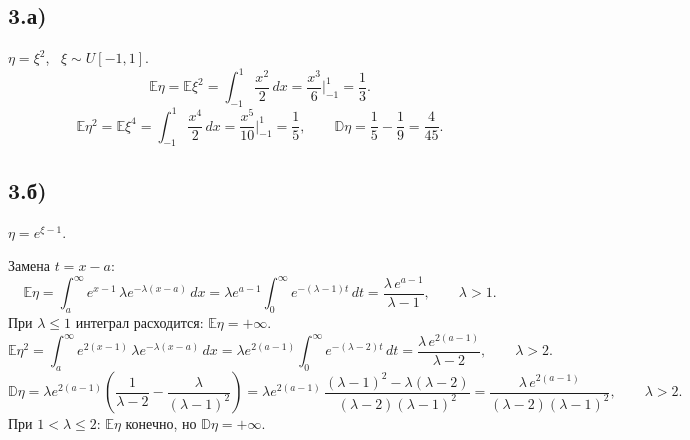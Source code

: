 \documentclass[11pt,a4paper]{article}
\newcommand{\E}{\mathbb{E}}
\newcommand{\D}{\mathbb{D}}
\begin{document}
\subsection*{3.а)} $\eta = \xi^2$, \ $\xi\sim U[-1,1]$.
\[
  \E\eta = \E\xi^2 = \int_{-1}^{1}\frac{x^2}{2}\,dx = \frac{x^3}{6}\Big|_{-1}^{1} = \boxed{\frac13}.
\]
\[
  \E\eta^2 = \E\xi^4 = \int_{-1}^{1}\frac{x^4}{2}\,dx = \frac{x^5}{10}\Big|_{-1}^{1} = \frac15,
  \qquad
  \D\eta = \frac15 - \frac19 = \boxed{\frac{4}{45}}.
\]

\subsection*{3.б)} $\eta = e^{\xi-1}$.

Замена $t = x - a$:
\[
  \E\eta = \int_a^\infty e^{x-1}\,\lambda e^{-\lambda(x-a)}\,dx
         = \lambda e^{a-1}\int_0^\infty e^{-(\lambda-1)t}\,dt
         = \boxed{\frac{\lambda\,e^{a-1}}{\lambda-1}}, \qquad \lambda>1 .
\]
При $\lambda\le 1$ интеграл расходится: $\E\eta = +\infty$.
\[
  \E\eta^2 = \int_a^\infty e^{2(x-1)}\,\lambda e^{-\lambda(x-a)}\,dx
           = \lambda e^{2(a-1)}\int_0^\infty e^{-(\lambda-2)t}\,dt
           = \frac{\lambda\,e^{2(a-1)}}{\lambda-2}, \qquad \lambda>2 .
\]
\[
  \D\eta = \lambda e^{2(a-1)}\left(\frac{1}{\lambda-2} - \frac{\lambda}{(\lambda-1)^2}\right)
         = \lambda e^{2(a-1)}\,\frac{(\lambda-1)^2 - \lambda(\lambda-2)}{(\lambda-2)(\lambda-1)^2}
         = \boxed{\frac{\lambda\,e^{2(a-1)}}{(\lambda-2)(\lambda-1)^2}}, \qquad \lambda>2 .
\]
При $1<\lambda\le 2$: $\E\eta$ конечно, но $\D\eta = +\infty$.
\end{document}
